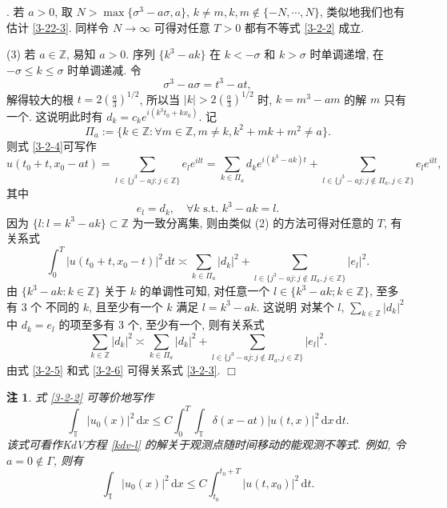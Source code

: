 \documentclass[master]{cugthesis}
\newcommand\Z{\ensuremath{\mathbb{Z}}}
\newcommand\T{\ensuremath{\mathbb{T}}}
\renewcommand\d{\ensuremath{\,\mathrm{d}}}
\newenvironment{proof}{{\noindent\itshape 证明}.}{\hfill $\Box$\par}
\newtheorem{remark}{注}
\begin{document}
\begin{proof}
    若 $a>0$, 取 $N>\max\lbrace\sigma^3-a\sigma, a\rbrace$, $k\neq m, k,m\notin \lbrace-N,\cdots, N\rbrace$, 类似地我们也有估计 \eqref{3-22-3}. 同样令 $N\to \infty$ 可得对任意 $T>0$ 都有不等式 \eqref{3-2-2} 成立. 
    
    (3) 若 $a\in \Z$, 易知 $a>0$. 序列 $\lbrace k^3-ak\rbrace$ 在 $k<-\sigma$ 和 $k>\sigma$ 时单调递增, 在 $-\sigma\le k\le \sigma$ 时单调递减. 令
    \begin{equation*}
        \sigma^3-a\sigma=t^3-at,
    \end{equation*}
    解得较大的根 $t=2\left(\frac{a}{3}\right)^{1 /2}$,
    所以当 $|k|> 2\left(\frac{a}{3}\right)^{1 /2}$ 时, $k=m^3-am$ 的解 $m$ 只有一个. 这说明此时有 $d_k=c_k e^{i(k^3t_0+kx_0)}$. 记
    \begin{equation*}
        \Pi_a:=\lbrace k\in \Z : \forall m\in \Z, m\neq k, k^2+mk+m^2\neq a \rbrace.
    \end{equation*}
    则式 \eqref{3-2-4}可写作
    \begin{equation*}
        u(t_0+t,x_0-at)=\sum_{l\in \lbrace j^3-aj:j\in \Z  \rbrace}e_l e^{ilt}=\sum_{k\in \Pi_a} d_k e^{i(k^3-ak)t}+\sum_{l\in \lbrace j^3-aj: j\notin \Pi_a, j\in \Z\rbrace} e_l e^{ilt},
    \end{equation*}  
    其中
    \begin{equation*}
        e_l=d_k, \quad \forall k \text{ s.t. } k^3-ak=l.
    \end{equation*}
    因为 $\lbrace l: l=k^3-ak \rbrace \subset \Z $ 为一致分离集, 则由类似 (2) 的方法可得对任意的 $T$, 有关系式
    \begin{equation}\label{3-2-5}
        \int_0^T|u(t_0+t,x_0-t)|^2\d t\asymp \sum_{k\in \Pi_a}|d_k|^2+\sum_{l\in \lbrace j^3-aj: j \notin \Pi_a,j\in\Z\rbrace }|e_l|^2.
    \end{equation}
    由 $\lbrace k^3-ak:k\in \Z\rbrace$ 关于 $k$ 的单调性可知, 对任意一个 $l\in \lbrace k^3-ak; k\in \Z\rbrace$, 至多有 3 个 不同的 $k$, 且至少有一个 $k$  满足 $l=k^3-ak$. 这说明 对某个 $l$, $\sum_{k\in\Z} |d_k|^2$ 中 $d_k=e_l$ 的项至多有 3 个, 至少有一个, 则有关系式
    \begin{equation}\label{3-2-6}
        \sum_{k\in \Z}|d_k|^2\asymp  \sum_{k\in \Pi_a}|d_k|^2+\sum_{l\in \lbrace j^3-aj: j \notin \Pi_a,j\in\Z\rbrace }|e_l|^2.
    \end{equation}
    由式 \eqref{3-2-5} 和式 \eqref{3-2-6} 可得关系式 \eqref{3-2-3}.
    \end{proof}
    
    \begin{remark}
    式 \eqref{3-2-2} 可等价地写作
    \begin{equation*}
        \int_{\T}|u_0(x)|^2\d x\le C\int_0^T\int_{\T}\delta(x-at)|u(t,x)|^2\d x\d t.
    \end{equation*}
    该式可看作KdV方程 \eqref{kdv-l} 的解关于观测点随时间移动的能观测不等式. 例如, 令 $a=0\notin \Gamma$, 则有
    \begin{equation*}
        \int_{\T}|u_0(x)|^2\d x\le C\int_{t_0}^{t_0+T} |u(t,x_0)|^2\d t.
    \end{equation*}
    \end{remark}
    
\end{document}
